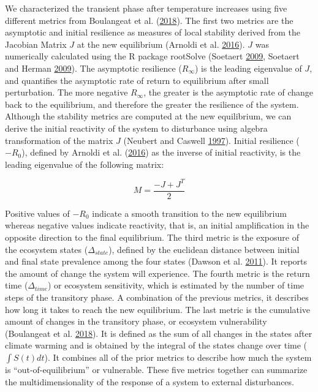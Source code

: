 \documentclass[12pt]{article}
\begin{document}
We characterized the transient phase after temperature increases using
five different metrics from Boulangeat et al.
(\protect\hyperlink{ref-Boulangeat2018}{2018}). The first two metrics
are the asymptotic and initial resilience as measures of local stability
derived from the Jacobian Matrix \(J\) at the new equilibrium (Arnoldi
et al. \protect\hyperlink{ref-Arnoldi2016}{2016}). \(J\) was numerically
calculated using the R package rootSolve (Soetaert
\protect\hyperlink{ref-Soetaert2009a}{2009}, Soetaert and Herman
\protect\hyperlink{ref-Soetaert2009}{2009}). The asymptotic resilience
(\(R_{\infty}\)) is the leading eigenvalue of \(J\), and quantifies the
asymptotic rate of return to equilibrium after small perturbation. The
more negative \(R_{\infty}\), the greater is the asymptotic rate of
change back to the equilibrium, and therefore the greater the resilience
of the system. Although the stability metrics are computed at the new
equilibrium, we can derive the initial reactivity of the system to
disturbance using algebra transformation of the matrix \(J\) (Neubert
and Caswell \protect\hyperlink{ref-Neubert1997}{1997}). Initial
resilience (\(-R_0\)), defined by Arnoldi et al.
(\protect\hyperlink{ref-Arnoldi2016}{2016}) as the inverse of initial
reactivity, is the leading eigenvalue of the following matrix:

\begin{equation}
M = \frac{-J + J^T}{2}
\label{eq:jacob}\end{equation}

Positive values of \(-R_0\) indicate a smooth transition to the new
equilibrium whereas negative values indicate reactivity, that is, an
initial amplification in the opposite direction to the final
equilibrium. The third metric is the exposure of the ecosystem states
(\(\Delta_{state}\)), defined by the euclidean distance between initial
and final state prevalence among the four states (Dawson et al.
\protect\hyperlink{ref-Dawson2011}{2011}). It reports the amount of
change the system will experience. The fourth metric is the return time
(\(\Delta_{time}\)) or ecosystem sensitivity, which is estimated by the
number of time steps of the transitory phase. A combination of the
previous metrics, it describes how long it takes to reach the new
equilibrium. The last metric is the cumulative amount of changes in the
transitory phase, or ecosystem vulnerability (Boulangeat et al.
\protect\hyperlink{ref-Boulangeat2018}{2018}). It is defined as the sum
of all changes in the states after climate warming and is obtained by
the integral of the states change over time (\(\int S(t)dt\)). It
combines all of the prior metrics to describe how much the system is
``out-of-equilibrium'' or vulnerable. These five metrics together can
summarize the multidimensionality of the response of a system to
external disturbances.
\end{document}
